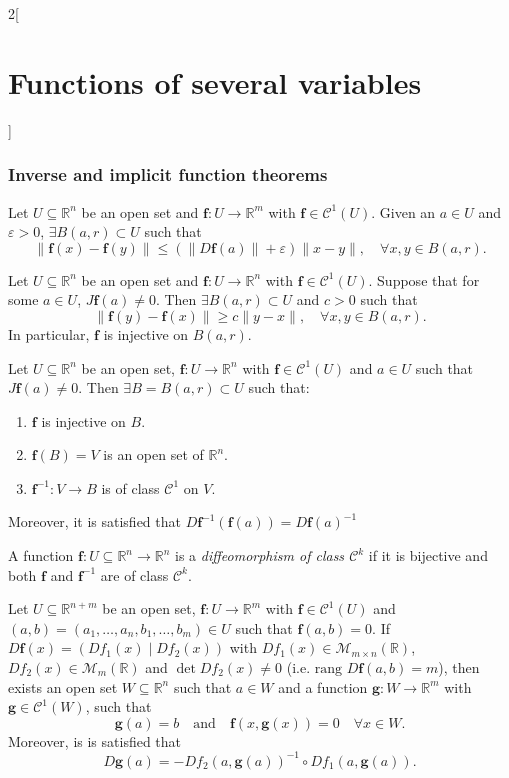 \documentclass[../../../main.tex]{subfiles}
\begin{document}
\begin{multicols}{2}[\section{Functions of several variables}]
\subsubsection*{Inverse and implicit function theorems}
\begin{lemma}
Let $U\subseteq\mathbb{R}^n$ be an open set and $\boldsymbol{f}:U\rightarrow\mathbb{R}^m$ with $\boldsymbol{f}\in \mathcal{C}^1(U)$. Given an $a\in U$ and $\varepsilon>0$, $\exists B(a,r)\subset U$ such that $$\|\boldsymbol{f}(x)-\boldsymbol{f}(y)\|\leq(\|D\boldsymbol{f}(a)\|+\varepsilon)\|x-y\|,\quad\forall x,y\in B(a,r).$$
\end{lemma}
\begin{lemma}
Let $U\subseteq\mathbb{R}^n$ be an open set and $\boldsymbol{f}:U\rightarrow\mathbb{R}^n$ with $\boldsymbol{f}\in \mathcal{C}^1(U)$. Suppose that for some $a\in U$, $J\boldsymbol{f}(a)\ne 0$. Then $\exists B(a,r)\subset U$ and $c>0$ such that $$\|\boldsymbol{f}(y)-\boldsymbol{f}(x)\|\geq c\|y-x\|,\quad\forall x,y\in B(a,r).$$ In particular, $\boldsymbol{f}$ is injective on $B(a,r)$.
\end{lemma}
\begin{theorem}
Let $U\subseteq\mathbb{R}^n$ be an open set, $\boldsymbol{f}:U\rightarrow\mathbb{R}^n$ with $\boldsymbol{f}\in \mathcal{C}^1(U)$ and $a\in U$ such that $J\boldsymbol{f}(a)\ne0$. Then $\exists B=B(a,r)\subset U$ such that:
\begin{enumerate}
    \item $\boldsymbol{f}$ is injective on $B$.
    \item $\boldsymbol{f}(B)=V$ is an open set of $\mathbb{R}^n$.
    \item $\boldsymbol{f}^{-1}:V\rightarrow B$ is of class $\mathcal{C}^1$ on $V$.
\end{enumerate} Moreover, it is satisfied that $D\boldsymbol{f}^{-1}(\boldsymbol{f}(a))=D\boldsymbol{f}(a)^{-1}$
\end{theorem}
\begin{definition}
A function $\boldsymbol{f}:U\subseteq\mathbb{R}^n\rightarrow\mathbb{R}^n$ is a \textit{diffeomorphism of class $\mathcal{C}^k$} if it is bijective and both $\boldsymbol{f}$ and $\boldsymbol{f}^{-1}$ are of class $\mathcal{C}^k$.
\end{definition}
\begin{theorem}
Let $U\subseteq\mathbb{R}^{n+m}$ be an open set, $\boldsymbol{f}:U\rightarrow\mathbb{R}^m$ with $\boldsymbol{f}\in \mathcal{C}^1(U)$ and $(a,b)=(a_1,\ldots,a_n,b_1,\ldots,b_m)\in U$ such that $\boldsymbol{f}(a,b)=0$. If $D\boldsymbol{f}(x)=(Df_1(x)\;|\;Df_2(x))$ with $Df_1(x)\in\mathcal{M}_{m\times n}(\mathbb{R})$, $Df_2(x)\in\mathcal{M}_m(\mathbb{R})$ and $\det Df_2(x)\ne 0$ (i.e. $\text{rang }D\boldsymbol{f}(a,b)=m$), then exists an open set $W\subseteq\mathbb{R}^n$ such that $a\in W$ and a function $\boldsymbol{g}:W\rightarrow\mathbb{R}^m$ with $\boldsymbol{g}\in\mathcal{C}^1(W)$, such that $$\boldsymbol{g}(a)=b\quad\text{and}\quad \boldsymbol{f}(x,\boldsymbol{g}(x))=0\quad\forall x\in W.$$ Moreover, is is satisfied that $$D\boldsymbol{g}(a)=-Df_2(a,\boldsymbol{g}(a))^{-1}\circ Df_1(a,\boldsymbol{g}(a)).$$

\end{theorem}
\end{multicols}
\end{document}
